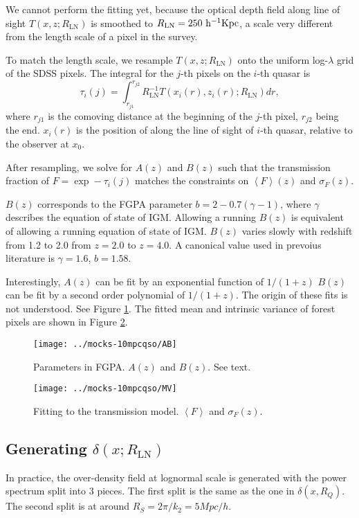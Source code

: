 \documentclass{paper}
\begin{document}
    We cannot perform the fitting yet, because the 
    optical depth field along line of sight $T(x, z; R_\mathrm{LN})$ 
    is smoothed to $R_\mathrm{LN} = 250 \,\kpch$, a scale
    very different from the length scale of a pixel in the survey.

    To match the length scale, we resample $T(x, z; R_\mathrm{LN})$ 
    onto the uniform log-$\lambda$ grid of the SDSS pixels. 
    The integral for the $j$-th pixels on the $i$-th
    quasar is
    \[
        \tau_i(j) = \int_{r_{j1}}^{r_{j2}} 
        R_\mathrm{LN}^{-1} T(x_i(r), z_i(r); R_\mathrm{LN}) d r, 
    \]
    where $r_{j1}$ is the comoving distance at the beginning of 
    the $j$-th pixel, $r_{j2}$ being the end.
    $x_i(r)$ is the position of along the line of sight of
    $i$-th quasar, relative to the observer at $x_0$. 

    After resampling, we solve for $A(z)$ and $B(z)$ such
    that the transmission fraction 
    of $F = \exp -\tau_i(j)$  matches the constraints on
    $\left<F\right>(z)$ and $\sigma_F(z)$. 

    $B(z)$ corresponds to the FGPA parameter 
    $b = 2-0.7(\gamma-1)$, where $\gamma$ describes the equation of 
    state of IGM.  Allowing a running $B(z)$ 
    is equivalent of allowing a running equation of state of IGM.
    $B(z)$ varies slowly with redshift from 1.2 to 2.0 from
    $z=2.0$ to $z=4.0$. A canonical value used in prevoius
    literature is $\gamma = 1.6$, $b=1.58$.

    Interestingly, $A(z)$ can be fit by an exponential function of $1/(1+z)$
    $B(z)$ can be fit by a second order polynomial of
    $1/(1+z)$. The origin of these fits is not understood.
    See Figure \ref{fig:FGPA-AB}. The fitted mean
    and intrinsic variance of forest pixels are shown in
    Figure \ref{fig:FGPA-MV}.

    \begin{figure}
      \texttt{[image: ../mocks-10mpcqso/AB]}
      \caption{Parameters in FGPA. $A(z)$ and $B(z)$. See text.}
      \label{fig:FGPA-AB}
    \end{figure}

    \begin{figure}
      \texttt{[image: ../mocks-10mpcqso/MV]}
      \caption{Fitting to the transmission model. $\left<F\right>$ and
$\sigma_F(z)$.}
      \label{fig:FGPA-MV}
    \end{figure}

\subsection{Generating $\delta(x; R_\mathrm{LN})$}
    In practice, the over-density field at lognormal scale is
    generated with the power spectrum split into 3 pieces.
    The first split is the same as the one in $\delta(x, R_Q)$. 
    The second split is at around $R_S = 2\pi / k_2 = 5
    \unit{Mpc/h}$.
\end{document}
